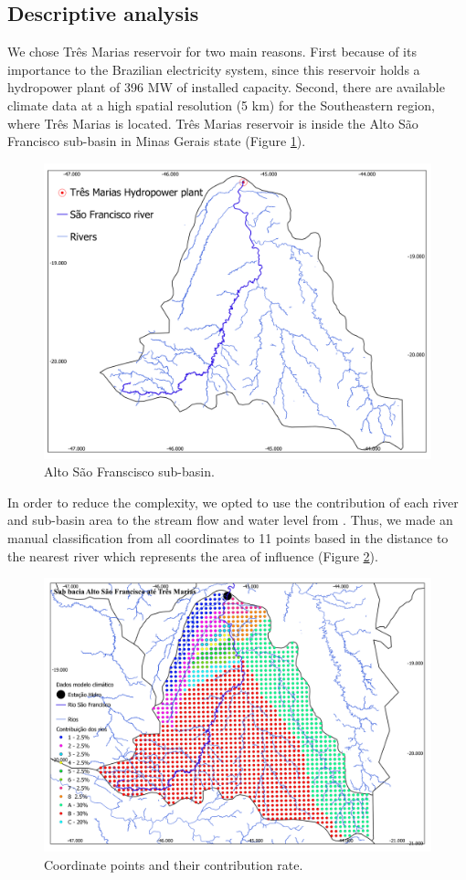 \documentclass[12pt]{article}
\begin{document}
\subsection{Descriptive analysis}
We chose Três Marias reservoir for two main reasons. First because of its importance to the Brazilian electricity system, since this reservoir holds a hydropower plant of 396 MW of installed capacity. Second, there are available climate data at a high spatial resolution (5 km) for the Southeastern region, where Três Marias is located. Três Marias reservoir is inside the Alto São Francisco sub-basin in Minas Gerais state (Figure \ref{fig:studyarea}).

\begin{figure}[htbp]
  \centering
  \includegraphics[width=0.6\linewidth]{Figures/mapa_v0.png}
  \caption{Alto São Franscisco sub-basin.}
  \label{fig:studyarea}
\end{figure}

In order to reduce the complexity, we opted to use the contribution of each river and sub-basin area to the stream flow and water level from \cite{fundep}. Thus, we made an manual classification from all coordinates to 11 points based in the distance to the nearest river which represents the area of influence (Figure \ref{fig:coord}).

\begin{figure}[htbp]
  \centering
  \includegraphics[width=0.6\linewidth]{Figures/coord_contribuicao.png}
  \caption{Coordinate points and their contribution rate.}
  \label{fig:coord}
\end{figure}
\end{document}
